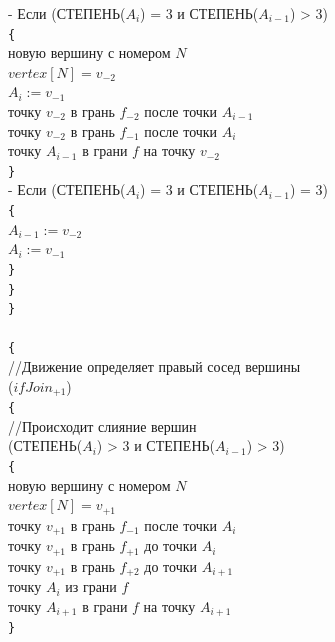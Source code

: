 \documentclass[a4paper,12pt, titlepage]{article}
\begin{document}
\begin{flushleft}
\quad\quad{} - Если (СТЕПЕНЬ($A_{i}$) = 3 и СТЕПЕНЬ($A_{i - 1}$) > 3)\\
\quad\quad\quad\verb"{"\\
\quad\quad\quad{} новую вершину с номером $N$\\
\quad\quad\quad\quad$vertex[N] = v_{-2}$\\
\quad\quad\quad\quad$A_{i} := v_{-1}$\\
\quad\quad\quad{} точку $v_{-2}$ в грань $f_{-2}$ после точки $A_{i - 1}$\\
\quad\quad\quad{} точку $v_{-2}$ в грань $f_{-1}$ после точки $A_{i}$\\
\quad\quad\quad{} точку $A_{i - 1}$ в грани $f$ на точку $v_{-2}$\\
\quad\quad\quad\verb"}"\\

\quad\quad{} - Если (СТЕПЕНЬ($A_{i}$) = 3 и СТЕПЕНЬ($A_{i - 1}$) = 3)\\
\quad\quad\quad\verb"{"\\
\quad\quad\quad\quad$A_{i - 1} := v_{-2}$\\
\quad\quad\quad\quad$A_{i} := v_{-1}$\\
\quad\quad\quad\verb"}"\\

\quad\quad\verb"}"\\
\quad\verb"}"\\
\\
\quad\verb"{"\\
\quad\quad//Движение определяет правый сосед вершины\\
\quad{}($ifJoin_{+1}$)\\
\quad\quad\verb"{"\\
\quad\quad\quad//Происходит слияние вершин\\

\quad\quad{} (СТЕПЕНЬ($A_{i}$) > 3 и СТЕПЕНЬ($A_{i - 1}$) > 3)\\
\quad\quad\quad\verb"{"\\
\quad\quad\quad{} новую вершину с номером $N$\\
\quad\quad\quad\quad$vertex[N] = v_{+1}$\\
\quad\quad\quad{} точку $v_{+1}$ в грань $f_{-1}$ после точки $A_{i}$\\
\quad\quad\quad{} точку $v_{+1}$ в грань $f_{+1}$ до точки $A_{i}$\\
\quad\quad\quad{} точку $v_{+1}$ в грань $f_{+2}$ до точки $A_{i + 1}$\\
\quad\quad\quad{} точку $A_{i}$ из грани $f$\\
\quad\quad\quad{} точку $A_{i + 1}$ в грани $f$ на точку $A_{i + 1}$\\
\quad\quad\quad\verb"}"\\


\end{flushleft}
\end{document}
